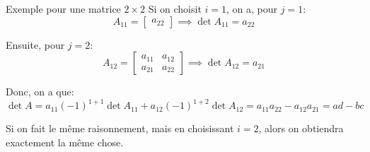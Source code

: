 \documentclass[a4paper]{article}
\begin{document}
\begin{parag}{Exemple pour une matrice $2 \times 2$}
    Si on choisit $i = 1$, on a, pour $j = 1$:
    \[A_{11} = \begin{bmatrix} a_{22} \end{bmatrix} \implies \det A_{11} = a_{22}\]

    Ensuite, pour $j = 2$:
    \[A_{12} = \begin{bmatrix} a_{11} & a_{12} \\ a_{21} & a_{22} \end{bmatrix} \implies \det A_{12} = a_{21}\]

    Donc, on a que:
    \[\det A = a_{11} \left(-1\right)^{1 + 1} \det A_{11} + a_{12} \left(-1\right)^{1 + 2}\det A_{12} = a_{11} a_{22} - a_{12} a_{21} = ad - bc\]

    Si on fait le même raisonnement, mais en choisissant $i = 2$, alors on obtiendra exactement la même chose.
\end{parag}
\end{document}
